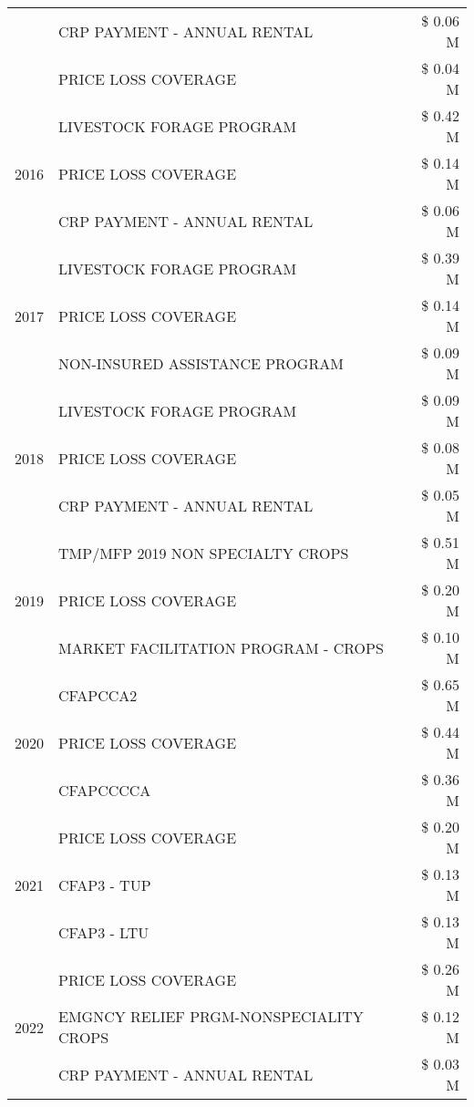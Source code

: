 \begin{tabular}{llr}
 & CRP PAYMENT - ANNUAL RENTAL & \$ 0.06 M \\
 & PRICE LOSS COVERAGE & \$ 0.04 M \\
\cline{1-3}
\multirow[t]{3}{*}{2016} & LIVESTOCK FORAGE PROGRAM & \$ 0.42 M \\
 & PRICE LOSS COVERAGE & \$ 0.14 M \\
 & CRP PAYMENT - ANNUAL RENTAL & \$ 0.06 M \\
\cline{1-3}
\multirow[t]{3}{*}{2017} & LIVESTOCK FORAGE PROGRAM & \$ 0.39 M \\
 & PRICE LOSS COVERAGE & \$ 0.14 M \\
 & NON-INSURED ASSISTANCE PROGRAM & \$ 0.09 M \\
\cline{1-3}
\multirow[t]{3}{*}{2018} & LIVESTOCK FORAGE PROGRAM & \$ 0.09 M \\
 & PRICE LOSS COVERAGE & \$ 0.08 M \\
 & CRP PAYMENT - ANNUAL RENTAL & \$ 0.05 M \\
\cline{1-3}
\multirow[t]{3}{*}{2019} & TMP/MFP 2019 NON SPECIALTY CROPS & \$ 0.51 M \\
 & PRICE LOSS COVERAGE & \$ 0.20 M \\
 & MARKET FACILITATION PROGRAM - CROPS & \$ 0.10 M \\
\cline{1-3}
\multirow[t]{3}{*}{2020} & CFAPCCA2 & \$ 0.65 M \\
 & PRICE LOSS COVERAGE & \$ 0.44 M \\
 & CFAPCCCCA & \$ 0.36 M \\
\cline{1-3}
\multirow[t]{3}{*}{2021} & PRICE LOSS COVERAGE & \$ 0.20 M \\
 & CFAP3 - TUP & \$ 0.13 M \\
 & CFAP3 - LTU & \$ 0.13 M \\
\cline{1-3}
\multirow[t]{3}{*}{2022} & PRICE LOSS COVERAGE & \$ 0.26 M \\
 & EMGNCY RELIEF PRGM-NONSPECIALITY CROPS & \$ 0.12 M \\
 & CRP PAYMENT - ANNUAL RENTAL & \$ 0.03 M \\
\cline{1-3}
\bottomrule
\end{tabular}
